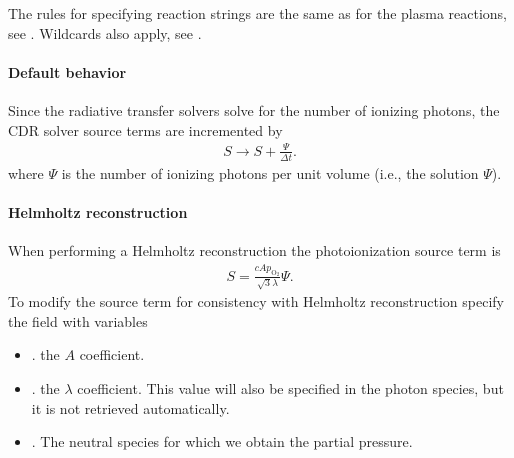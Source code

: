 \documentclass[letterpaper,10pt,english]{sphinxmanual}
\begin{document}
The rules for specifying reaction strings are the same as for the plasma reactions, see .
Wildcards also apply, see {\hyperref[\detokenize{Applications/CdrPlasmaModel:cdrplasma-wildcards}]{}}.


\paragraph{Default behavior}
\label{\detokenize{Applications/CdrPlasmaModel:default-behavior}}
Since the radiative transfer solvers solve for the number of ionizing photons, the CDR solver source terms are incremented by
\begin{equation*}
\begin{split}S \rightarrow S + \frac{\Psi}{\Delta t}.\end{split}
\end{equation*}
where \(\Psi\) is the number of ionizing photons per unit volume (i.e., the solution \(\Psi\)).


\paragraph{Helmholtz reconstruction}
\label{\detokenize{Applications/CdrPlasmaModel:helmholtz-reconstruction}}
When performing a Helmholtz reconstruction the photoionization source term is
\begin{equation*}
\begin{split}S = \frac{c A p_{\textrm{O}_2}}{\sqrt{3}\lambda}\Psi.\end{split}
\end{equation*}
To modify the source term for consistency with Helmholtz reconstruction specify the field  with variables
\begin{itemize}
\item {} 
. the \(A\) coefficient.

\item {} 
. the \(\lambda\) coefficient.
This value will also be specified in the photon species, but it is not retrieved automatically.

\item {} 
. The neutral species for which we obtain the partial pressure.

\end{itemize}
\end{document}
